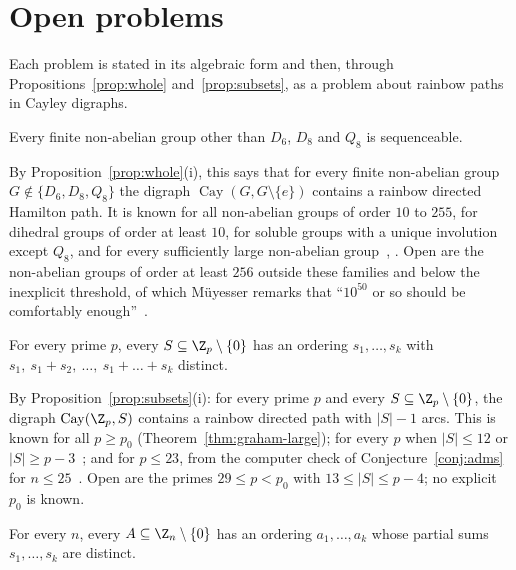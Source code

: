 \section{Open problems}\label{sec:open}

Each problem is stated in its algebraic form and then, through Propositions~\ref{prop:whole} and~\ref{prop:subsets}, as a problem about rainbow paths in Cayley digraphs.

\begin{conjecture}\label{conj:keedwell}
Every finite non-abelian group other than $D_6$, $D_8$ and $Q_8$ is sequenceable.
\end{conjecture}

By Proposition~\ref{prop:whole}(i), this says that for every finite non-abelian group $G\notin\{D_6,D_8,Q_8\}$ the digraph $\operatorname{Cay}(G,G\setminus\{e\})$ contains a rainbow directed Hamilton path. It is known for all non-abelian groups of order $10$ to $255$, for dihedral groups of order at least $10$, for soluble groups with a unique involution except $Q_8$, and for every sufficiently large non-abelian group~\cite{mp22}, \cite[\S2.6]{oll25}. Open are the non-abelian groups of order at least $256$ outside these families and below the inexplicit threshold, of which M\"uyesser remarks that ``$10^{50}$ or so should be comfortably enough''~\cite[\S2.5]{oll25}.

\begin{conjecture}\label{conj:graham-every}
For every prime $p$, every $S\subseteq\Z_p\setminus\{0\}$ has an ordering $s_1,\dots,s_k$ with $s_1,\ s_1+s_2,\ \dots,\ s_1+\dots+s_k$ distinct.
\end{conjecture}

By Proposition~\ref{prop:subsets}(i): for every prime $p$ and every $S\subseteq\Z_p\setminus\{0\}$, the digraph $\operatorname{Cay}(\Z_p,S)$ contains a rainbow directed path with $|S|-1$ arcs. This is known for all $p\geq p_0$ (Theorem~\ref{thm:graham-large}); for every $p$ when $|S|\leq12$ or $|S|\geq p-3$~\cite{hos19,cdor22}; and for $p\leq23$, from the computer check of Conjecture~\ref{conj:adms} for $n\leq25$~\cite[\S1]{hos19}. Open are the primes $29\leq p<p_0$ with $13\leq|S|\leq p-4$; no explicit $p_0$ is known.

\begin{conjecture}\label{conj:adms-open}
For every $n$, every $A\subseteq\Z_n\setminus\{0\}$ has an ordering $a_1,\dots,a_k$ whose partial sums $s_1,\dots,s_k$ are distinct.
\end{conjecture}

